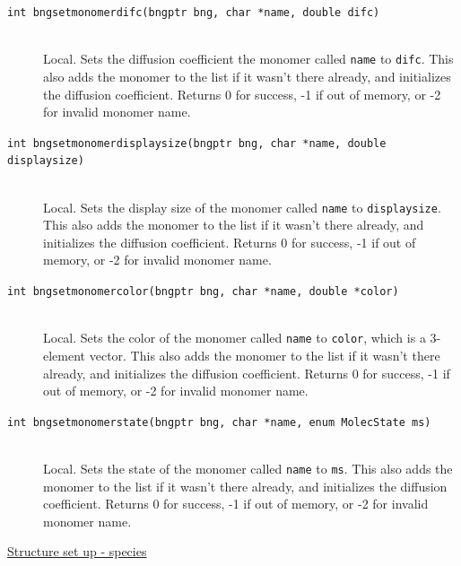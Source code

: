 \documentclass {scrbook}
\newcommand {\ttt} {\texttt}
\begin{document}
\begin{description}
\item[\ttt{int bngsetmonomerdifc(bngptr bng, char *name, double difc)}]
\hfill \\
Local. Sets the diffusion coefficient the monomer called \ttt{name} to \ttt{difc}. This also adds the monomer to the list if it wasn't there already, and initializes the diffusion coefficient. Returns 0 for success, -1 if out of memory, or -2 for invalid monomer name.

\item[\ttt{int bngsetmonomerdisplaysize(bngptr bng, char *name, double displaysize)}]
\hfill \\
Local. Sets the display size of the monomer called \ttt{name} to \ttt{displaysize}. This also adds the monomer to the list if it wasn't there already, and initializes the diffusion coefficient. Returns 0 for success, -1 if out of memory, or -2 for invalid monomer name.

\item[\ttt{int bngsetmonomercolor(bngptr bng, char *name, double *color)}]
\hfill \\
Local. Sets the color of the monomer called \ttt{name} to \ttt{color}, which is a 3-element vector. This also adds the monomer to the list if it wasn't there already, and initializes the diffusion coefficient. Returns 0 for success, -1 if out of memory, or -2 for invalid monomer name.

\item[\ttt{int bngsetmonomerstate(bngptr bng, char *name, enum MolecState ms)}]
\hfill \\
Local. Sets the state of the monomer called \ttt{name} to \ttt{ms}. This also adds the monomer to the list if it wasn't there already, and initializes the diffusion coefficient. Returns 0 for success, -1 if out of memory, or -2 for invalid monomer name.

\item[\underline{Structure set up - species}]


\end{description}
\end{document}
